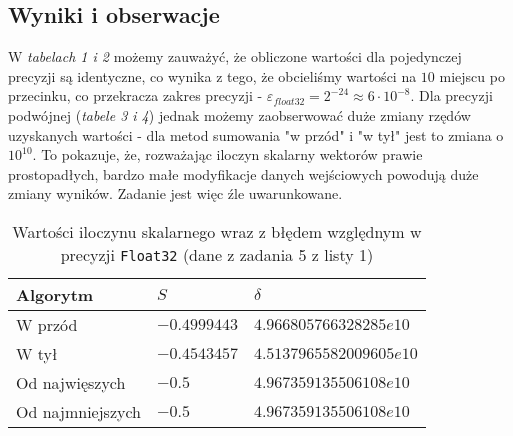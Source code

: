 \documentclass[12pt]{article}
\begin{document}
    \subsection*{Wyniki i obserwacje}
        W \textit{tabelach 1 i 2} możemy zauważyć, że obliczone wartości dla pojedynczej precyzji są identyczne, co wynika z tego, że obcieliśmy wartości na $10$ miejscu po przecinku, co przekracza zakres precyzji - $\varepsilon_{float32} = 2^{-24} \approx 6 \cdot 10^{-8}$.
        \newline
        Dla precyzji podwójnej (\textit{tabele 3 i 4}) jednak możemy zaobserwować duże zmiany rzędów uzyskanych wartości - dla metod sumowania "w przód" i "w tył" jest to zmiana o $10^{10}$.
        \newline
        To pokazuje, że, rozważając iloczyn skalarny wektorów prawie prostopadłych, bardzo małe modyfikacje danych wejściowych powodują duże zmiany wyników.
        \newline
        Zadanie jest więc źle uwarunkowane.

        \newpage

        \begin{table}[h!]
            \centering
            \begin{tabularx}{0.67\textwidth}{l l l}
                \hline
                Algorytm & $S$ & $\delta$ \\
                \hline
                W przód & $-0.4999443$ & $4.966805766328285e10$ \\
                W tył & $-0.4543457$ & $4.5137965582009605e10$ \\
                Od najwięszych & $-0.5$ & $4.967359135506108e10$ \\
                Od najmniejszych & $-0.5$ & $4.967359135506108e10$ \\
                \hline
            \end{tabularx}
            \caption{Wartości iloczynu skalarnego wraz z błędem względnym w precyzji \texttt{Float32} (dane z zadania 5 z listy 1)}
            \label{table:dot_prod_32}
        \end{table}
\end{document}
